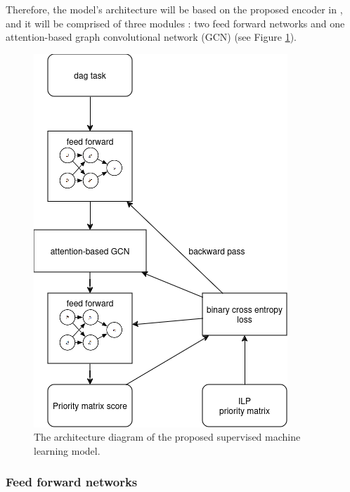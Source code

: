 Therefore, the model's architecture will be based on the proposed encoder in \citet{Lee2021GlobalDagSchedDRL},
and it will be comprised of three modules :
two feed forward networks and one attention-based graph convolutional network (GCN) (see Figure \ref{fig:model_diagram}).

\begin{figure}
    \centering
    \includegraphics[width=\linewidth]{images/designed_model.png}
    \caption{The architecture diagram of the proposed supervised machine learning model.}
    \label{fig:model_diagram}
\end{figure}

\subsubsection{Feed forward networks}
~

